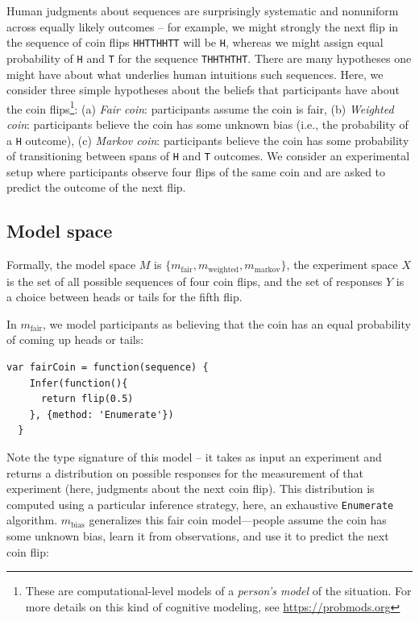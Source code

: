 \documentclass{article}
\begin{document}
Human judgments about sequences are surprisingly systematic and nonuniform across equally likely outcomes -- for example, we might strongly the next flip in the  sequence of coin flips \lstinline{HHTTHHTT} will be \lstinline{H}, whereas we might assign equal probability of \lstinline{H} and \lstinline{T} for the sequence \lstinline{THHTHTHT}.
There are many hypotheses one might have about what underlies human intuitions such sequences.
Here, we consider three simple hypotheses about the beliefs that participants have about the coin flips\footnote{These are computational-level models of a \emph{person's model} of the situation. For more details on this kind of cognitive modeling, see \url{https://probmods.org}}: (a) \emph{Fair coin}: participants assume the coin is fair, (b) \emph{Weighted coin}: participants believe the coin has some unknown bias (i.e., the probability of a \lstinline{H} outcome), (c) \emph{Markov coin}: participants believe the coin has some probability of transitioning between spans of \lstinline{H} and \lstinline{T} outcomes.
We consider an experimental setup where participants observe four flips of the same coin and are asked to predict the outcome of the next flip.


\subsection{Model space}

Formally, the model space $M$ is $\{m_{\text{fair}}, m_{\text{weighted}}, m_{\text{markov}}\}$, the experiment space $X$ is the set of all possible sequences of four coin flips, and the set of responses $Y$ is a choice between heads or tails for the fifth flip.

In $m_{\text{fair}}$, we model participants as believing that the coin has an equal probability of coming up heads or tails:

\begin{lstlisting}[caption=Fair coin model,  label={lst:m_fair}]
  var fairCoin = function(sequence) {
    Infer(function(){
      return flip(0.5)
    }, {method: 'Enumerate'})
  }
\end{lstlisting}

Note the type signature of this model -- it takes as input an experiment and returns a distribution on possible responses for the measurement of that experiment (here, judgments about the next coin flip).
This distribution is computed using a particular inference strategy, here, an exhaustive \lstinline{Enumerate} algorithm.
$m_{\text{bias}}$ generalizes this fair coin model---people assume the coin has some unknown bias, learn it from observations, and use it to predict the next coin flip:
\end{document}
